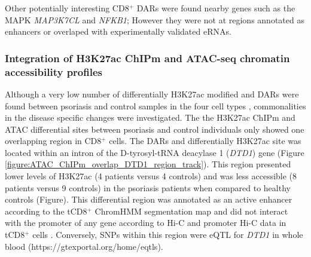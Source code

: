 Other potentially interesting CD8$^+$ DARs were found nearby genes such as the MAPK \textit{MAP3K7CL} and \textit{NFKB1}; However they were not at regions annotated as enhancers or overlaped with experimentally validated eRNAs. 


\subsubsection{Integration of H3K27ac ChIPm and ATAC-seq chromatin accessibility profiles}

Although a very low number of differentially H3K27ac modified and DARs were found between psoriasis and control samples in the four cell types , commonalities in the disease specific changes were investigated. The the H3K27ac ChIPm and ATAC differential sites between psoriasis and control individuals only showed one overlapping region in CD8$^+$ cells. The DARs and differentially H3K27ac site was located within an intron of the D-tyrosyl-tRNA deacylase 1 (\textit{DTD1}) gene (Figure \ref{figure:ATAC_ChIPm_overlap_DTD1_region_track}). This region presented lower levels of H3K27ac (4 patients versus 4 controls) and was less accessible (8 patients versus 9 controls) in the psoriasis patients when compared to healthy controls (Figure). This differential region was annotated as an active enhancer according to the tCD8$^+$ ChromHMM segmentation map and did not interact with the promoter of any gene according to Hi-C and promoter Hi-C data in tCD8$^+$ cells \parencite{Javierre2016}. Conversely, SNPs within this region were eQTL for \textit{DTD1} in whole blood (https://gtexportal.org/home/eqtls). 

